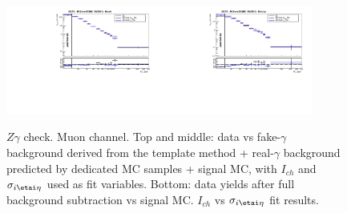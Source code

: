 \begin{figure}[htb]
\begin{center}
\includegraphics[width=0.45\textwidth]{../figs/figs_v11/MUON_ZGamma/PrepareYields/c_BkgSubtrDATAvsSIGMC_c_MUON_ZGamma__UNblind__Barrel__phoEt.pdf}\includegraphics[width=0.45\textwidth]{../figs/figs_v11/MUON_ZGamma/PrepareYields/c_BkgSubtrDATAvsSIGMC_c_MUON_ZGamma__UNblind__Endcap__phoEt.pdf}\\
  \caption{$Z\gamma$ check. Muon channel. Top and middle: data vs fake-$\gamma$ background derived from the template method + real-$\gamma$ background predicted by dedicated MC samples + signal MC, with $I_{ch}$ and $\sigma_{i\etai\eta}$ used as fit variables. Bottom: data yields after full background subtraction vs signal MC. $I_{ch}$ vs $\sigma_{i\etai\eta}$ fit results. }
  \label{fig:DDvsMC_Zg_Data_MUON}
  \end{center}
\end{figure}


